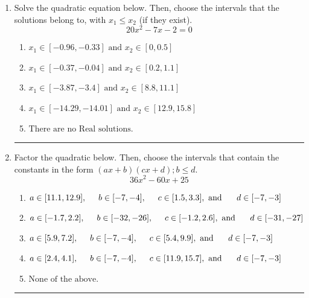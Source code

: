 \documentclass[14pt]{extbook}
\newcommand{\litem}[1]{\item#1\hspace*{-1cm}\rule{\textwidth}{0.4pt}}
\begin{document}
\begin{enumerate}
{\begin{enumerate}[label=\Alph*.]
\end{enumerate} }
\litem{
Solve the quadratic equation below. Then, choose the intervals that the solutions belong to, with $x_1 \leq x_2$ (if they exist).\[ 20x^{2} -7 x -2 = 0 \]\begin{enumerate}[label=\Alph*.]
\item \( x_1 \in [-0.96, -0.33] \text{ and } x_2 \in [0, 0.5] \)
\item \( x_1 \in [-0.37, -0.04] \text{ and } x_2 \in [0.2, 1.1] \)
\item \( x_1 \in [-3.87, -3.4] \text{ and } x_2 \in [8.8, 11.1] \)
\item \( x_1 \in [-14.29, -14.01] \text{ and } x_2 \in [12.9, 15.8] \)
\item \( \text{There are no Real solutions.} \)

\end{enumerate} }
\litem{
Factor the quadratic below. Then, choose the intervals that contain the constants in the form $(ax+b)(cx+d); b \leq d.$\[ 36x^{2} -60 x + 25 \]\begin{enumerate}[label=\Alph*.]
\item \( a \in [11.1, 12.9], \hspace*{5mm} b \in [-7, -4], \hspace*{5mm} c \in [1.5, 3.3], \text{ and } \hspace*{5mm} d \in [-7, -3] \)
\item \( a \in [-1.7, 2.2], \hspace*{5mm} b \in [-32, -26], \hspace*{5mm} c \in [-1.2, 2.6], \text{ and } \hspace*{5mm} d \in [-31, -27] \)
\item \( a \in [5.9, 7.2], \hspace*{5mm} b \in [-7, -4], \hspace*{5mm} c \in [5.4, 9.9], \text{ and } \hspace*{5mm} d \in [-7, -3] \)
\item \( a \in [2.4, 4.1], \hspace*{5mm} b \in [-7, -4], \hspace*{5mm} c \in [11.9, 15.7], \text{ and } \hspace*{5mm} d \in [-7, -3] \)
\item \( \text{None of the above.} \)


\end{enumerate}}
\end{enumerate}
\end{document}
